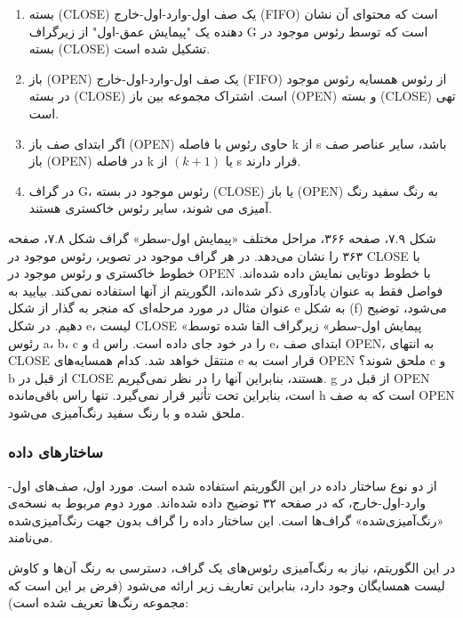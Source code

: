 \documentclass{book} %
\begin{document}
\begin{enumerate}
    \item  بسته (CLOSE) یک صف اول-وارد-اول-خارج (FIFO) است که محتوای آن نشان دهنده یک "پیمایش عمق-اول" از زیرگراف G است که توسط رئوس موجود در بسته (CLOSE) تشکیل شده است.
    
    \item  باز (OPEN) یک صف اول-وارد-اول-خارج (FIFO) از رئوس همسایه رئوس موجود در بسته (CLOSE) است. اشتراک مجموعه بین باز (OPEN) و بسته (CLOSE) تهی است.

    \item اگر ابتدای صف باز (OPEN) حاوی رئوس با فاصله k از s باشد، سایر عناصر صف باز (OPEN) در فاصله k یا $(k + 1)$ از s قرار دارند.

    \item در گراف G، رئوس موجود در بسته (CLOSE) یا باز (OPEN) به رنگ سفید رنگ آمیزی می شوند، سایر رئوس خاکستری هستند.
\end{enumerate}
\newpage

شکل ۷.۹، صفحه ۳۶۶، مراحل مختلف «پیمایش اول-سطر» گراف شکل ۷.۸، صفحه ۳۶۳ را نشان می‌دهد. در هر گراف موجود در تصویر، رئوس موجود در CLOSE با خطوط خاکستری و رئوس موجود در OPEN با خطوط دوتایی نمایش داده شده‌اند. فواصل فقط به عنوان یادآوری ذکر شده‌اند، الگوریتم از آنها استفاده نمی‌کند. بیایید به عنوان مثال در مورد مرحله‌ای که منجر به گذار از شکل e به شکل (f) می‌شود، توضیح دهیم. در شکل e، لیست CLOSE «پیمایش اول-سطر» زیرگراف القا شده توسط رئوس a، b، c و d را در خود جای داده است. راس e، ابتدای صف OPEN، به انتهای CLOSE منتقل خواهد شد. کدام همسایه‌های e قرار است به OPEN ملحق شوند؟ c و b از قبل در CLOSE هستند، بنابراین آنها را در نظر نمی‌گیریم. g از قبل در OPEN است، بنابراین تحت تأثیر قرار نمی‌گیرد. تنها راس باقی‌مانده h است که به صف OPEN ملحق شده و با رنگ سفید رنگ‌آمیزی می‌شود.

\subsubsection*{ساختارهای داده}

از دو نوع ساختار داده در این الگوریتم استفاده شده است. مورد اول، صف‌های اول-وارد-اول-خارج، که در صفحه ۳۲ توضیح داده شده‌اند. مورد دوم مربوط به نسخه‌ی «رنگ‌آمیزی‌شده» گراف‌ها است.
این ساختار داده را گراف بدون جهت رنگ‌آمیزی‌شده می‌نامند.

در این الگوریتم، نیاز به رنگ‌آمیزی رئوس‌های یک گراف، دسترسی به رنگ آن‌ها و کاوش لیست همسایگان وجود دارد، بنابراین تعاریف زیر ارائه می‌شود (فرض بر این است که مجموعه رنگ‌ها تعریف شده است):
\end{document}

